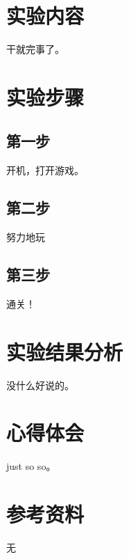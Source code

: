 \documentclass[UTF8]{article} %
{\tiny }
\begin{document}
	\section{实验内容}
	干就完事了。
	\section{实验步骤}
	\subsection{第一步}
	开机，打开游戏。
	\subsection{第二步}
	努力地玩
	\subsection{第三步}
	通关！
	\section{实验结果分析}
	没什么好说的。
	\section{心得体会}
	just so so。
	\section{参考资料}
	无
	
\end{document}
